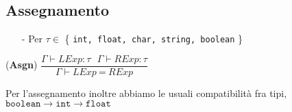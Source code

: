 \documentclass[12pt]{article}
\begin{document}
\subsection*{Assegnamento}
\begin{center}
\begin{itemize}
\item[-] Per $\tau \in$ \{ \texttt{int, float, char, string, boolean} \}
\end{itemize}
\noindent(\textbf{Asgn})
$\dfrac{\Gamma \vdash LExp:\tau\ \ \ \Gamma \vdash RExp:\tau}{\Gamma \vdash LExp \ \texttt{=} \ RExp}$\\[0.1in]
\end{center}
Per l'assegnamento inoltre abbiamo le usuali compatibilità fra tipi,\linebreak$ \texttt{boolean} \rightarrow \texttt{int} \rightarrow\texttt{float}$
\end{document}
